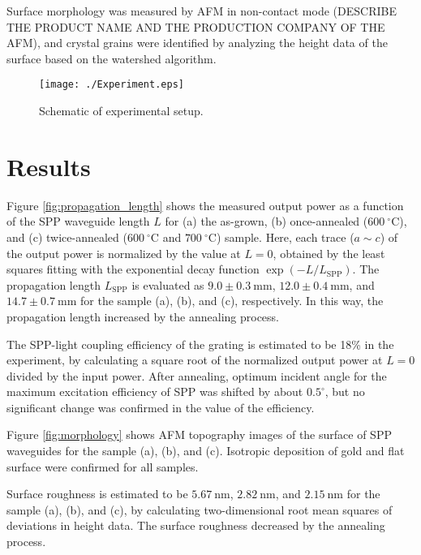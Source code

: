\documentclass[twocolumn,10.5pt,a4]{article}
\begin{document}
Surface morphology was measured by AFM in non-contact mode (DESCRIBE THE PRODUCT NAME AND THE PRODUCTION COMPANY OF THE AFM), and crystal grains were identified by analyzing the height data of the surface based on the watershed algorithm\cite{Petr}.


 \begin{figure}[!htbp]
   \begin{center}
    \texttt{[image: ./Experiment.eps]}
    \caption{Schematic of experimental setup.}
     \label{fig:experiment}
   \end{center}
\end{figure}


\section{Results}
\label{sec:result}
Figure \ref{fig:propagation_length} shows the measured output power as a function of the SPP waveguide length $L$ for (a) the as-grown, (b) once-annealed ($600\:^\circ\mathrm{C}$), and (c) twice-annealed ($600\:^\circ\mathrm{C}$ and $700\:^\circ\mathrm{C}$) sample.
Here, each trace ($a\!\sim\!c$) of the output power is normalized by the value at $L=0$, obtained by the least squares fitting with the exponential decay function $\exp(-L/L_{\mathrm{SPP}})$. 
The propagation length $L_{\mathrm{SPP}}$ is evaluated as $9.0\pm0.3\:\mathrm{mm}$, $12.0\pm0.4\:\mathrm{mm}$, and $14.7\pm0.7\:\mathrm{mm}$ for the sample (a), (b), and (c), respectively.
In this way, the propagation length increased by the annealing process.

The SPP-light coupling efficiency of the grating is estimated to be 18\% in the experiment, by calculating a square root of the normalized output power at $L=0$ divided by the input power.
After annealing, optimum incident angle for the maximum excitation efficiency of SPP was shifted by about $0.5^\circ$, but no significant change was confirmed in the value of the efficiency.

Figure \ref{fig:morphology} shows AFM topography images of the surface of SPP waveguides for the sample (a), (b), and (c).
Isotropic deposition of gold and flat surface were confirmed for all samples. 

Surface roughness is estimated to be $5.67\:\mathrm{nm}$, $2.82\:\mathrm{nm}$, and $2.15\:\mathrm{nm}$ for the sample (a), (b), and (c), by calculating two-dimensional root mean squares of deviations in height data. 
The surface roughness decreased by the annealing process.
\end{document}

